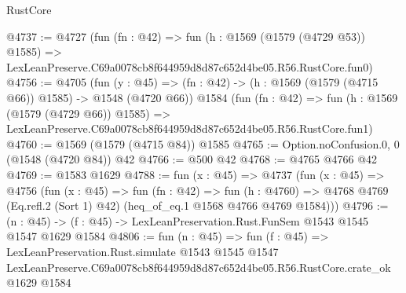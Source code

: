 \begin{lexlean}{RustCore}
\begin{coremodule}
@4737 := @4727
    (fun (fn : @42) =>
    fun (h : @1569 (@1579 (@4729 @53)) @1585) =>
    LexLeanPreserve.C69a0078cb8f644959d8d87c652d4be05.R56.RustCore.fun0)
@4756 := @4705
    (fun (y : @45) => (fn : @42) -> (h : @1569 (@1579 (@4715 @66)) @1585) -> @1548 (@4720 @66))
    @1584
    (fun (fn : @42) =>
    fun (h : @1569 (@1579 (@4729 @66)) @1585) =>
    LexLeanPreserve.C69a0078cb8f644959d8d87c652d4be05.R56.RustCore.fun1)
@4760 := @1569 (@1579 (@4715 @84)) @1585
@4765 := Option.noConfusion.{0, 0} (@1548 (@4720 @84)) @42
@4766 := @500 @42
@4768 := @4765 @4766 @42
@4769 := @1583 @1629
@4788 := fun (x : @45) =>
  @4737
    (fun (x : @45) =>
    @4756
      (fun (x : @45) =>
      fun (fn : @42) =>
      fun (h : @4760) =>
      @4768 @4769 (Eq.refl.{2} (Sort 1) @42) (heq_of_eq.{1} @1568 @4766 @4769 @1584)))
@4796 := (n : @45) -> (f : @45) -> LexLeanPreservation.Rust.FunSem @1543 @1545 @1547 @1629 @1584
@4806 := fun (n : @45) =>
  fun (f : @45) =>
  LexLeanPreservation.Rust.simulate
    @1543
    @1545
    @1547
    LexLeanPreserve.C69a0078cb8f644959d8d87c652d4be05.R56.RustCore.crate_ok
    @1629
    @1584
\end{coremodule}
\end{lexlean}
